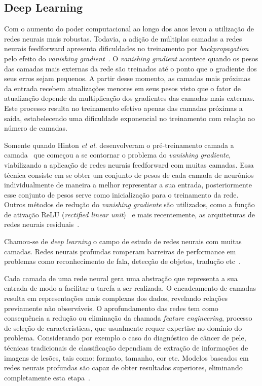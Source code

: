 \subsection{Deep Learning}

Com o aumento do poder computacional ao longo dos anos levou a utilização de redes neurais mais robustas.
Todavia, a adição de múltiplas camadas a redes neurais feedforward apresenta dificuldades no treinamento por
\textit{backpropagation} pelo efeito do \textit{vanishing gradient}~\cite{hochreiter98}.
O \textit{vanishing gradient} acontece quando os pesos das camadas mais externas da rede são treinados até o ponto que
o gradiente dos seus erros sejam pequenos.
A partir desse momento, as camadas mais próximas da entrada recebem atualizações menores em seus pesos visto que o fator
de atualização depende da multiplicação dos gradientes das camadas mais externas.
Este processo resulta no treinamento efetivo apenas das camadas próximas a saída, estabelecendo uma dificuldade
exponencial no treinamento com relação ao número de camadas.

Somente quando Hinton \textit{et al.} desenvolveram o pré-treinamento camada a camada~\cite{hinton06} que começou a se
contornar o problema do \textit{vanishing gradiente}, viabilizando a aplicação de redes neurais feedforward com muitas
camadas.
Essa técnica consiste em se obter um conjunto de pesos de cada camada de neurônios individualmente de maneira a melhor
representar a sua entrada, posteriormente esse conjunto de pesos serve como inicialização para o treinamento da rede.
Outros métodos de redução do \textit{vanishing gradiente} são utilizados, como a função de ativação ReLU
(\textit{rectified linear unit})~\cite{nair10} e mais recentemente, as arquiteturas de redes neurais
residuais~\cite{he16}.

Chamou-se de \textit{deep learning} o campo de estudo de redes neurais com muitas camadas.
Redes neurais profundas romperam barreiras de performance em problemas como reconhecimento de fala, detecção de
objetos, tradução etc~\cite{lecun15}.

Cada camada de uma rede neural gera uma abstração que representa a sua entrada de modo a facilitar a tarefa a ser
realizada.
O encadeamento de camadas resulta em representações mais complexas dos dados, revelando relações previamente não
observáveis.
O aprofundamento das redes tem como consequência a redução ou eliminação da chamada \textit{feature engineering},
processo de seleção de características, que usualmente requer expertise no domínio do problema.
Considerando por exemplo o caso do diagnóstico de câncer de pele, técnicas tradicionais de classificação dependiam de
extração de informações de imagens de lesões, tais como: formato, tamanho, cor etc.
Modelos baseados em redes neurais profundas são capaz de obter resultados superiores, eliminando completamente esta
etapa~\cite{esteva17}.


